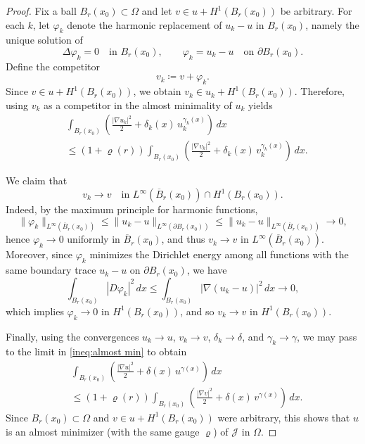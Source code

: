 \documentclass[reqno,11pt]{amsart}
\newcommand{\1}{\mathds{1}}  %
\numberwithin{equation}{section}
\begin{document}
\begin{proof}
Fix a ball $B_r(x_0) \subset \Omega$ and let $v\in u+H^1(B_r(x_0))$ be arbitrary. For each $k$, let $\varphi_k$ denote the harmonic replacement of $u_k-u$ in $B_r(x_0)$, namely the unique solution of
\[
    \Delta\varphi_k=0 \quad\text{in }B_r(x_0), \qquad \varphi_k=u_k-u \quad\text{on }\partial B_r(x_0).
\]
Define the competitor
\[
    v_k \coloneqq v+\varphi_k.
\]
Since $v \in u + H^1(B_r(x_0))$, we obtain $v_k\in u_k+H^1(B_r(x_0))$. Therefore, using $v_k$ as a competitor in the almost minimality of $u_k$ yields
\begin{equation}\label{ineq:almost min} 
\begin{aligned} 
    &\int_{B_r(x_0)} \left(\frac{|\nabla u_k|^2}{2} + \delta_k(x)\,u_k^{\gamma_k(x)}\right)\,dx \\ 
    &\le (1 + \varrho(r)) \int_{B_r(x_0)} \left(\frac{|\nabla v_k|^2}{2} + \delta_k(x)\,v_k^{\gamma_k(x)}\right)\,dx . 
\end{aligned} 
\end{equation}

We claim that
\[
    v_k \to v \quad\text{in } L^\infty(\overline{B}_r(x_0))\cap H^1(B_r(x_0)).
\]
Indeed, by the maximum principle for harmonic functions,
\[
    \|\varphi_k\|_{L^\infty(\overline{B}_r(x_0))} \le \|u_k-u\|_{L^\infty(\partial B_r(x_0))} \le \|u_k-u\|_{L^\infty(\overline{B}_r(x_0))}\to 0,
\]
hence $\varphi_k\to 0$ uniformly in $\overline{B}_r(x_0)$, and thus $v_k\to v$ in $L^\infty(\overline{B}_r(x_0))$. Moreover, since $\varphi_k$ minimizes the Dirichlet energy among all functions with the same boundary trace $u_k-u$ on $\partial B_r(x_0)$, we have
\[
    \int_{B_r(x_0)}|D\varphi_k|^2\,dx \le \int_{B_r(x_0)}|\nabla(u_k-u)|^2\,dx \to 0,
\]
which implies $\varphi_k\to 0$ in $H^1(B_r(x_0))$, and so $v_k\to v$ in $H^1(B_r(x_0))$.

Finally, using the convergences $u_k\to u$, $v_k\to v$, $\delta_k\to\delta$, and $\gamma_k\to\gamma$, we may pass to the limit in \eqref{ineq:almost min} to obtain
\[
    \begin{aligned} 
    &\int_{B_r(x_0)} \left(\frac{|\nabla u|^2}{2} + \delta(x)\,u^{\gamma(x)}\right)\,dx \\ 
    &\le (1 + \varrho(r)) \int_{B_r(x_0)} \left(\frac{|\nabla v|^2}{2} + \delta(x)\,v^{\gamma(x)}\right)\,dx . 
    \end{aligned} 
\]
Since $B_r(x_0)\subset\Omega$ and $v\in u+H^1(B_r(x_0))$ were arbitrary, this shows that $u$ is an almost minimizer (with the same gauge $\varrho$) of $\mathcal J$ in $\Omega$.


\end{proof}
\end{document}
